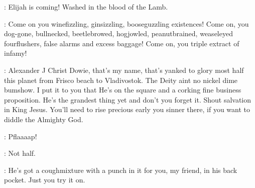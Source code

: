 \documentclass[12pt]{article}
\begin{document}
\Dw: Elijah is coming! Washed in the blood of the Lamb.

\Dw: Come on you winefizzling, ginsizzling, booseguzzling existences!
Come on, you dog-gone, bullnecked, beetlebrowed, hogjowled,
peanutbrained, weaseleyed fourflushers, false alarms and excess baggage!
Come on, you triple extract of infamy!

\Dw: Alexander J Christ Dowie, that's my name, that's
yanked to glory most half this planet from Frisco beach to Vladivostok.
The Deity aint no nickel dime bumshow. I put it to you that He's on the
square and a corking fine business proposition. He's the grandest thing
yet and don't you forget it. Shout salvation in King Jesus. You'll need
to rise precious early you sinner there, if you want to diddle the
Almighty God.

: Pflaaaap!

\SD: Not half.

\Dw: He's got a coughmixture with a punch in it for you, my friend,
in his back pocket. Just you try it on.
\end{document}
